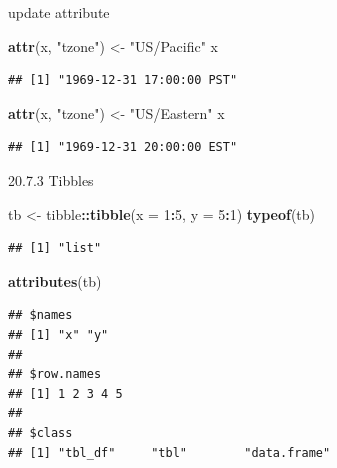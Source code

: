 \documentclass[ignorenonframetext,]{beamer}
\newenvironment{Shaded}{\begin{snugshade}}{\end{snugshade}}
\newcommand{\KeywordTok}[1]{\textcolor[rgb]{0.13,0.29,0.53}{\textbf{#1}}}
\newcommand{\DataTypeTok}[1]{\textcolor[rgb]{0.13,0.29,0.53}{#1}}
\newcommand{\DecValTok}[1]{\textcolor[rgb]{0.00,0.00,0.81}{#1}}
\newcommand{\StringTok}[1]{\textcolor[rgb]{0.31,0.60,0.02}{#1}}
\newcommand{\OperatorTok}[1]{\textcolor[rgb]{0.81,0.36,0.00}{\textbf{#1}}}
\newcommand{\NormalTok}[1]{#1}
\begin{document}
\begin{frame}[fragile]{update attribute}

\begin{Shaded}
\begin{Highlighting}[]
\KeywordTok{attr}\NormalTok{(x, }\StringTok{"tzone"}\NormalTok{) <-}\StringTok{ "US/Pacific"}
\NormalTok{x}
\end{Highlighting}
\end{Shaded}

\begin{verbatim}
## [1] "1969-12-31 17:00:00 PST"
\end{verbatim}

\begin{Shaded}
\begin{Highlighting}[]
\KeywordTok{attr}\NormalTok{(x, }\StringTok{"tzone"}\NormalTok{) <-}\StringTok{ "US/Eastern"}
\NormalTok{x}
\end{Highlighting}
\end{Shaded}

\begin{verbatim}
## [1] "1969-12-31 20:00:00 EST"
\end{verbatim}

\end{frame}

\begin{frame}[fragile]{20.7.3 Tibbles}

\begin{Shaded}
\begin{Highlighting}[]
\NormalTok{tb <-}\StringTok{ }\NormalTok{tibble}\OperatorTok{::}\KeywordTok{tibble}\NormalTok{(}\DataTypeTok{x =} \DecValTok{1}\OperatorTok{:}\DecValTok{5}\NormalTok{, }\DataTypeTok{y =} \DecValTok{5}\OperatorTok{:}\DecValTok{1}\NormalTok{)}
\KeywordTok{typeof}\NormalTok{(tb)}
\end{Highlighting}
\end{Shaded}

\begin{verbatim}
## [1] "list"
\end{verbatim}

\begin{Shaded}
\begin{Highlighting}[]
\KeywordTok{attributes}\NormalTok{(tb)}
\end{Highlighting}
\end{Shaded}

\begin{verbatim}
## $names
## [1] "x" "y"
## 
## $row.names
## [1] 1 2 3 4 5
## 
## $class
## [1] "tbl_df"     "tbl"        "data.frame"
\end{verbatim}

\end{frame}
\end{document}
